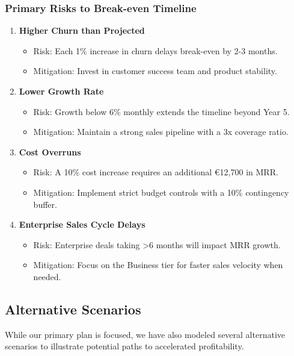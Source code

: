 \documentclass[11pt, a4paper, oneside]{article}
\begin{document}
\subsubsection{Primary Risks to Break-even Timeline}
\begin{enumerate}
    \item \textbf{Higher Churn than Projected}
    \begin{itemize}
        \item Risk: Each 1\% increase in churn delays break-even by 2-3 months.
        \item Mitigation: Invest in customer success team and product stability.
    \end{itemize}
    
    \item \textbf{Lower Growth Rate}
    \begin{itemize}
        \item Risk: Growth below 6\% monthly extends the timeline beyond Year 5.
        \item Mitigation: Maintain a strong sales pipeline with a 3x coverage ratio.
    \end{itemize}
    
    \item \textbf{Cost Overruns}
    \begin{itemize}
        \item Risk: A 10\% cost increase requires an additional \euro{12,700} in MRR.
        \item Mitigation: Implement strict budget controls with a 10\% contingency buffer.
    \end{itemize}
    
    \item \textbf{Enterprise Sales Cycle Delays}
    \begin{itemize}
        \item Risk: Enterprise deals taking >6 months will impact MRR growth.
        \item Mitigation: Focus on the Business tier for faster sales velocity when needed.
    \end{itemize}
\end{enumerate}

\subsection{Alternative Scenarios}
While our primary plan is focused, we have also modeled several alternative scenarios to illustrate potential paths to accelerated profitability.
\end{document}
